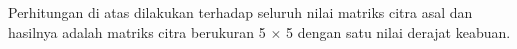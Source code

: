 \noindent Perhitungan di atas dilakukan terhadap seluruh nilai matriks citra asal dan hasilnya adalah matriks citra berukuran 5 $\times$ 5 dengan satu nilai derajat keabuan.
\begin{adjustbox}{width=1\textwidth}
	\noindent\begin{minipage}{\linewidth}
		\label{fig:MatriksCitraGrayscale}
	\end{minipage}
\end{adjustbox} \\

